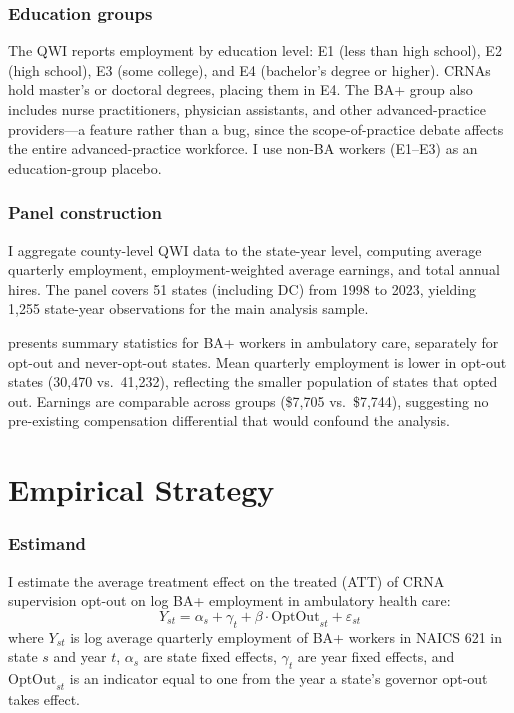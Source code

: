 \documentclass[12pt]{article}
\begin{document}
\subsubsection*{Education groups} The QWI reports employment by education level: E1 (less than high school), E2 (high school), E3 (some college), and E4 (bachelor's degree or higher). CRNAs hold master's or doctoral degrees, placing them in E4. The BA+ group also includes nurse practitioners, physician assistants, and other advanced-practice providers---a feature rather than a bug, since the scope-of-practice debate affects the entire advanced-practice workforce. I use non-BA workers (E1--E3) as an education-group placebo.

\subsubsection*{Panel construction} I aggregate county-level QWI data to the state-year level, computing average quarterly employment, employment-weighted average earnings, and total annual hires. The panel covers 51 states (including DC) from 1998 to 2023, yielding 1,255 state-year observations for the main analysis sample.



 presents summary statistics for BA+ workers in ambulatory care, separately for opt-out and never-opt-out states. Mean quarterly employment is lower in opt-out states (30,470 vs.\ 41,232), reflecting the smaller population of states that opted out. Earnings are comparable across groups (\$7,705 vs.\ \$7,744), suggesting no pre-existing compensation differential that would confound the analysis.


\section{Empirical Strategy}

\subsubsection*{Estimand} I estimate the average treatment effect on the treated (ATT) of CRNA supervision opt-out on log BA+ employment in ambulatory health care:
\begin{equation}
Y_{st} = \alpha_s + \gamma_t + \beta \cdot \text{OptOut}_{st} + \varepsilon_{st}
\end{equation}
where $Y_{st}$ is log average quarterly employment of BA+ workers in NAICS 621 in state $s$ and year $t$, $\alpha_s$ are state fixed effects, $\gamma_t$ are year fixed effects, and $\text{OptOut}_{st}$ is an indicator equal to one from the year a state's governor opt-out takes effect.
\end{document}
